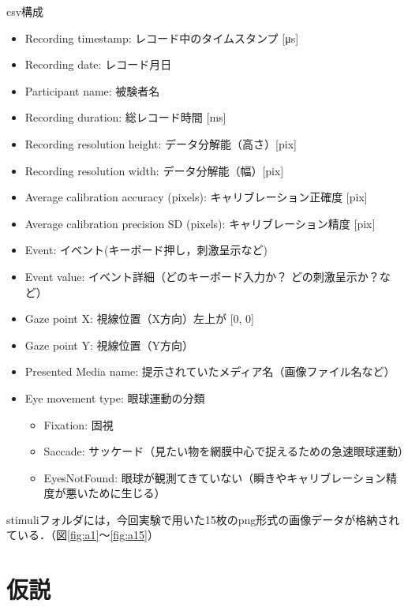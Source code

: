 \documentclass[a4paper,11pt]{ltjsreport}
\begin{document}
\begin{itembox}[l]{csv構成}
	\begin{small}
		\begin{itemize}
			\item Recording timestamp:  レコード中のタイムスタンプ [\si{\micro \second}]
			\item Recording date:       レコード月日
			\item Participant name:     被験者名
			\item Recording duration:   総レコード時間 [\si{\milli \second}]
			\item Recording resolution height:  データ分解能（高さ）[pix]
			\item Recording resolution width:   データ分解能（幅）[pix]
			\item Average calibration accuracy (pixels): キャリブレーション正確度 [pix]
			\item Average calibration precision SD (pixels): キャリブレーション精度 [pix]
			\item Event:                イベント(キーボード押し，刺激呈示など)
			\item Event value:          イベント詳細（どのキーボード入力か？ どの刺激呈示か？など）
			\item Gaze point X:         視線位置（X方向）左上が [0, 0]
			\item Gaze point Y:         視線位置（Y方向）
			\item Presented Media name: 提示されていたメディア名（画像ファイル名など）
			\item Eye movement type:    眼球運動の分類
			      \begin{itemize}
				      \item Fixation:     固視
				      \item Saccade:      サッケード（見たい物を網膜中心で捉えるための急速眼球運動）
				      \item EyesNotFound: 眼球が観測てきていない（瞬きやキャリブレーション精度が悪いために生じる）
			      \end{itemize}
		\end{itemize}
	\end{small}
\end{itembox}

stimuliフォルダには，今回実験で用いた15枚のpng形式の画像データが格納されている．（図\ref{fig:a1}〜\ref{fig:a15}）

\section{仮説}
\end{document}
